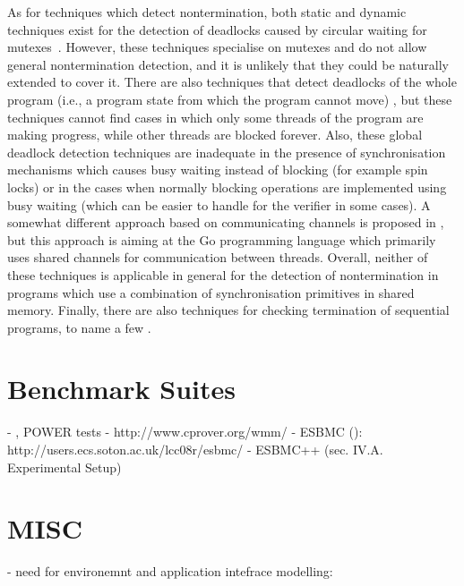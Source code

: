 As for techniques which detect nontermination, both static and dynamic
techniques exist for the detection of deadlocks caused by circular waiting for
mutexes~\cite{CC14,agarwal2010detection,bensalem2005scalable}.
However, these techniques specialise on mutexes and do not allow general nontermination detection, and it is unlikely that they could be naturally extended to cover it.
There are also techniques that detect deadlocks of the whole program (i.e., a program state from which the program cannot move) \cite{Chaki2005,Demartini99}, but these techniques cannot find cases in which only some threads of the program are making progress, while other threads are blocked forever.
Also, these global deadlock detection techniques are inadequate in the presence of synchronisation mechanisms which causes busy waiting instead of blocking (for example spin locks) or in the cases when normally blocking operations are implemented using busy waiting (which can be easier to handle for the verifier in some cases).
A somewhat different approach based on communicating channels is proposed in \cite{Ng2016}, but this approach is aiming at the Go programming language which primarily uses shared channels for communication between threads.
Overall, neither of these techniques is applicable in general for the detection of nontermination in programs which use a combination of synchronisation primitives in shared memory.
Finally, there are also techniques for checking termination of sequential programs, to name a few \cite{Giesl2017,Chen2018}.

\section{Benchmark Suites}

- \cite{Sarkar2011}, \cite{MadorHaim2012} POWER tests
- http://www.cprover.org/wmm/
- ESBMC (\cite{Cordeiro2011}): http://users.ecs.soton.ac.uk/lcc08r/esbmc/
- ESBMC++ \cite{Ramalho2016:19,6,27,.} (sec. IV.A. Experimental Setup)

\section{MISC}

- need for environemnt and application intefrace modelling: \cite{Cordeiro2016}

